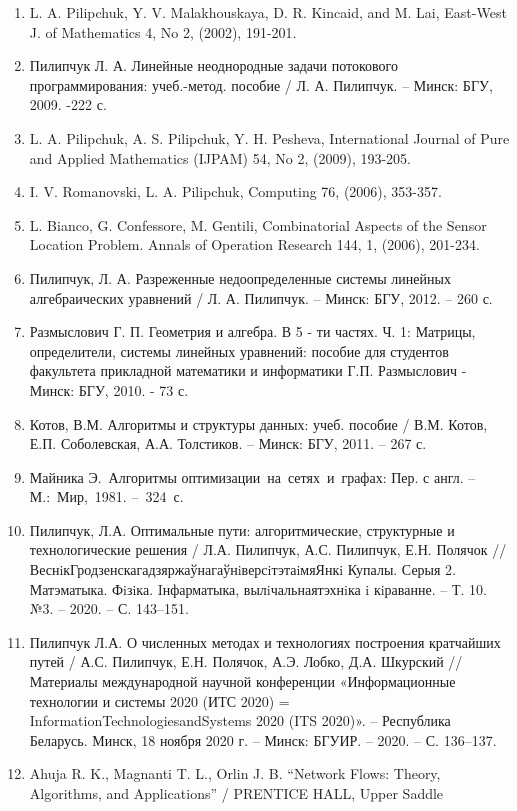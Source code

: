 \documentclass[14pt]{extarticle}%
\begin{document}
\begin{enumerate}
\item L. A. Pilipchuk, Y. V. Malakhouskaya, D. R. Kincaid, and M. Lai, East-West J. of Mathematics 4, No 2, (2002), 191-201.
\item Пилипчук Л. А. Линейные неоднородные задачи потокового программирования: учеб.-метод. пособие / Л. А. Пилипчук. -- Минск: БГУ, 2009. -222 с.
\item L. A. Pilipchuk, A. S. Pilipchuk, Y. H. Pesheva, International Journal of Pure and Applied Mathematics (IJPAM) 54, No 2, (2009), 193-205.
\item I. V. Romanovski, L. A. Pilipchuk, Computing 76, (2006), 353-357.
\item L. Bianco, G. Confessore, M. Gentili, Combinatorial Aspects of the Sensor Location Problem. Annals of Operation Research 144, 1, (2006), 201-234.
\item Пилипчук, Л. А. Разреженные недоопределенные системы линейных алгебраических уравнений / Л. А. Пилипчук. -- Минск: БГУ, 2012. -- 260 с.
\item Размыслович Г. П. Геометрия и алгебра. В 5 - ти частях. Ч. 1: Матрицы, определители, системы линейных уравнений: пособие для студентов факультета прикладной математики и информатики Г.П. Размыслович - Минск: БГУ, 2010. - 73 с.
\item Котов, В.М. Алгоритмы и структуры данных: учеб. пособие / В.М.
Котов, Е.П. Соболевская, А.А. Толстиков. -- Минск: БГУ, 2011. --
267 с.
\item Майника Э. Алгоритмы оптимизации на сетях и графах: Пер. с
англ. -- М.: Мир, 1981. -- 324 с. 
\item Пилипчук, Л.А. Оптимальные пути: алгоритмические,
структурные и технологические решения / Л.А. Пилипчук, А.С.
Пилипчук, Е.Н. Полячок //
ВеснiкГродзенскагадзяржаўнагаўнiверсiтэтаiмяЯнкi Купалы.
Серыя 2. Матэматыка. Фiзiка. Iнфарматыка, вылiчальнаятэхнiка i
кiраванне. -- Т. 10. №3. -- 2020. -- С. 143--151.
\item Пилипчук Л.А. О численных методах и технологиях построения
кратчайших путей / А.С. Пилипчук, Е.Н. Полячок, А.Э. Лобко,
Д.А. Шкурский // Материалы международной научной
конференции «Информационные технологии и системы 2020 (ИТС
2020) = InformationTechnologiesandSystems 2020 (ITS 2020)». --
Республика Беларусь. Минск, 18 ноября 2020 г. -- Минск: БГУИР. --
2020. -- С. 136--137.
\item Ahuja R. K., Magnanti T. L., Orlin J. B. “Network Flows: Theory,
Algorithms, and Applications” / PRENTICE HALL, Upper Saddle

\end{enumerate}
\end{document}
